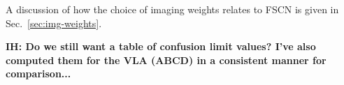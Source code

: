 \documentclass{aa}
\begin{document}
A discussion of how the choice of imaging weights relates to FSCN is given in Sec.~\ref{sec:img-weights}.

{\bf IH: Do we still want a table of confusion limit values? I've also computed them for the VLA (ABCD) in a consistent manner for comparison...}


\begin{minipage}{158mm}
\end{minipage}
\end{document}
